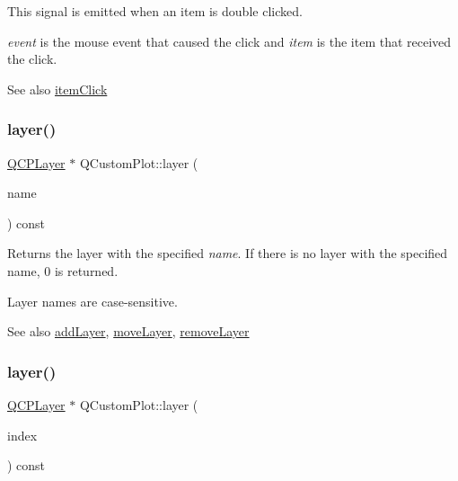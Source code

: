 This signal is emitted when an item is double clicked.

{\itshape event} is the mouse event that caused the click and {\itshape item} is the item that received the click.

\begin{DoxySeeAlso}{See also}
\hyperlink{class_q_custom_plot_ae16b51f52d2b7aebbc7e3e74e6ff2e4b}{item\+Click} 
\end{DoxySeeAlso}
\hypertarget{class_q_custom_plot_a0a96244e7773b242ef23c32b7bdfb159}{}\label{class_q_custom_plot_a0a96244e7773b242ef23c32b7bdfb159} 
\subsubsection{\texorpdfstring{layer()}{layer()}\hspace{0.1cm}{\footnotesize\ttfamily [1/2]}}
{\footnotesize\ttfamily \hyperlink{class_q_c_p_layer}{Q\+C\+P\+Layer} $\ast$ Q\+Custom\+Plot\+::layer (\begin{DoxyParamCaption}\item[{const Q\+String \&}]{name }\end{DoxyParamCaption}) const}

Returns the layer with the specified {\itshape name}. If there is no layer with the specified name, 0 is returned.

Layer names are case-\/sensitive.

\begin{DoxySeeAlso}{See also}
\hyperlink{class_q_custom_plot_ad5255393df078448bb6ac83fa5db5f52}{add\+Layer}, \hyperlink{class_q_custom_plot_ae896140beff19424e9e9e02d6e331104}{move\+Layer}, \hyperlink{class_q_custom_plot_a40f75e342c5eaab6a86066a42a0e2a94}{remove\+Layer} 
\end{DoxySeeAlso}
\hypertarget{class_q_custom_plot_acbb570f4c24306e7c2324d40bfe157c2}{}\label{class_q_custom_plot_acbb570f4c24306e7c2324d40bfe157c2} 
\subsubsection{\texorpdfstring{layer()}{layer()}\hspace{0.1cm}{\footnotesize\ttfamily [2/2]}}
{\footnotesize\ttfamily \hyperlink{class_q_c_p_layer}{Q\+C\+P\+Layer} $\ast$ Q\+Custom\+Plot\+::layer (\begin{DoxyParamCaption}\item[{int}]{index }\end{DoxyParamCaption}) const}

